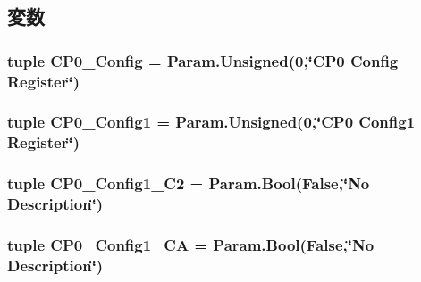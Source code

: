 \subsection{変数}
\hypertarget{classMipsCPU_1_1BaseMipsCPU_abefb45ade026543d3f48560708ac3cb5}{
\subsubsection[{CP0\_\-Config}]{\setlength{\rightskip}{0pt plus 5cm}tuple {\bf CP0\_\-Config} = Param.Unsigned(0,\char`\"{}CP0 Config {\bf Register}\char`\"{})}}
\label{classMipsCPU_1_1BaseMipsCPU_abefb45ade026543d3f48560708ac3cb5}
\hypertarget{classMipsCPU_1_1BaseMipsCPU_a41aef9d5fed85db3e8cbacaed6122566}{
\subsubsection[{CP0\_\-Config1}]{\setlength{\rightskip}{0pt plus 5cm}tuple {\bf CP0\_\-Config1} = Param.Unsigned(0,\char`\"{}CP0 Config1 {\bf Register}\char`\"{})}}
\label{classMipsCPU_1_1BaseMipsCPU_a41aef9d5fed85db3e8cbacaed6122566}
\hypertarget{classMipsCPU_1_1BaseMipsCPU_aa7b1faef28dbac130f3776cec7a9bb11}{
\subsubsection[{CP0\_\-Config1\_\-C2}]{\setlength{\rightskip}{0pt plus 5cm}tuple {\bf CP0\_\-Config1\_\-C2} = Param.Bool(False,\char`\"{}No Description\char`\"{})}}
\label{classMipsCPU_1_1BaseMipsCPU_aa7b1faef28dbac130f3776cec7a9bb11}
\hypertarget{classMipsCPU_1_1BaseMipsCPU_aaeff852b614f4308b401eff35b4f81a7}{
\subsubsection[{CP0\_\-Config1\_\-CA}]{\setlength{\rightskip}{0pt plus 5cm}tuple {\bf CP0\_\-Config1\_\-CA} = Param.Bool(False,\char`\"{}No Description\char`\"{})}}
